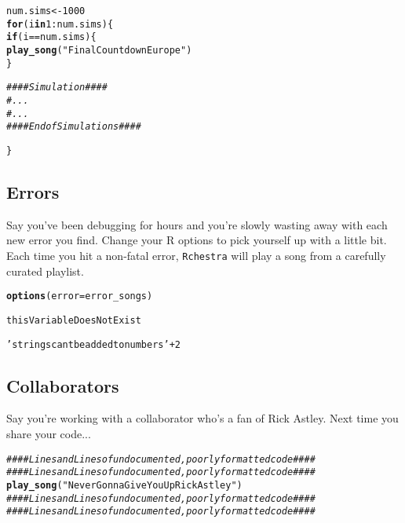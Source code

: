 \documentclass{article}\usepackage[]{graphicx}\usepackage[]{color}
\makeatletter
\newcommand{\hlnum}[1]{\textcolor[rgb]{0.686,0.059,0.569}{#1}}%
\newcommand{\hlstr}[1]{\textcolor[rgb]{0.192,0.494,0.8}{#1}}%
\newcommand{\hlcom}[1]{\textcolor[rgb]{0.678,0.584,0.686}{\textit{#1}}}%
\newcommand{\hlopt}[1]{\textcolor[rgb]{0,0,0}{#1}}%
\newcommand{\hlstd}[1]{\textcolor[rgb]{0.345,0.345,0.345}{#1}}%
\newcommand{\hlkwa}[1]{\textcolor[rgb]{0.161,0.373,0.58}{\textbf{#1}}}%
\newcommand{\hlkwb}[1]{\textcolor[rgb]{0.69,0.353,0.396}{#1}}%
\newcommand{\hlkwc}[1]{\textcolor[rgb]{0.333,0.667,0.333}{#1}}%
\newcommand{\hlkwd}[1]{\textcolor[rgb]{0.737,0.353,0.396}{\textbf{#1}}}%
\newenvironment{kframe}{%
 \def\at@end@of@kframe{}%
 \ifinner\ifhmode%
  \def\at@end@of@kframe{\end{minipage}}%
  \begin{minipage}{\columnwidth}%
 \fi\fi%
 \def\FrameCommand##1{\hskip\@totalleftmargin \hskip-\fboxsep
 \colorbox{shadecolor}{##1}\hskip-\fboxsep
     \hskip-\linewidth \hskip-\@totalleftmargin \hskip\columnwidth}%
 \MakeFramed {\advance\hsize-\width
   \@totalleftmargin\z@ \linewidth\hsize
   \@setminipage}}%
 {\par\unskip\endMakeFramed%
 \at@end@of@kframe}
\newenvironment{knitrout}{}{} %
\makeatother
\begin{document}
\begin{knitrout}
\color{fgcolor}\begin{kframe}
\begin{alltt}
\hlstd{num.sims} \hlkwb{<-} \hlnum{1000}
\hlkwa{for}\hlstd{(i} \hlkwa{in} \hlnum{1}\hlopt{:}\hlstd{num.sims)\{}
  \hlkwa{if}\hlstd{(i} \hlopt{==} \hlstd{num.sims)\{}
    \hlkwd{play_song}\hlstd{(}\hlstr{"Final Countdown Europe"}\hlstd{)}
  \hlstd{\}}

  \hlcom{#### Simulation ####}
  \hlcom{# ...}
  \hlcom{# ...}
  \hlcom{#### End of Simulations ####}

\hlstd{\}}
\end{alltt}
\end{kframe}
\end{knitrout}


\subsection{Errors}
Say you've been debugging for hours and you're slowly wasting away with each new error you find. Change your R options to pick yourself up with a little bit. Each time you hit a non-fatal error, \texttt{Rchestra} will play a song from a carefully curated playlist.

\begin{knitrout}
\color{fgcolor}\begin{kframe}
\begin{alltt}
\hlkwd{options}\hlstd{(}\hlkwc{error} \hlstd{= error_songs)}

\hlstd{thisVariableDoesNotExist}

\hlstr{'strings cant be added to numbers'} \hlopt{+} \hlnum{2}
\end{alltt}
\end{kframe}
\end{knitrout}

\subsection{Collaborators}
Say you're working with a collaborator who's a fan of Rick Astley. Next time you share your code...
\begin{knitrout}
\color{fgcolor}\begin{kframe}
\begin{alltt}
\hlcom{#### Lines and Lines of undocumented, poorly formatted code ####}
\hlcom{#### Lines and Lines of undocumented, poorly formatted code ####}
\hlkwd{play_song}\hlstd{(}\hlstr{"Never Gonna Give You Up Rick Astley"}\hlstd{)}
\hlcom{#### Lines and Lines of undocumented, poorly formatted code ####}
\hlcom{#### Lines and Lines of undocumented, poorly formatted code ####}
\end{alltt}
\end{kframe}
\end{knitrout}
\end{document}
